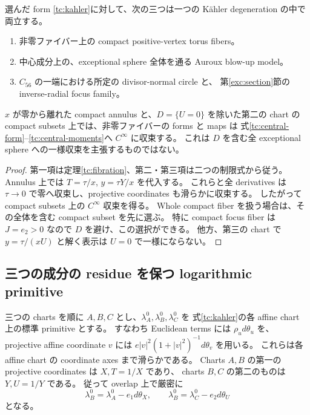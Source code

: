 \begin{corollary}\label{tc:common-model}
選んだ form \eqref{tc:kahler}に対して、次の三つは一つの Kähler degeneration の中で両立する。
\begin{enumerate}
\item 非零ファイバー上の compact positive-vertex torus fibers。
\item 中心成分上の、exceptional sphere 全体を通る Auroux blow-up model。
\item $C_{56}$ の一端における所定の divisor-normal circle と、
      第\ref{exc:section}節の inverse-radial focus family。
\end{enumerate}
$x$ が零から離れた compact annulus と、$D=\{U=0\}$ を除いた第二の chart の
compact subsets 上では、非零ファイバーの forms と maps は
式\eqref{tc:central-form}--\eqref{tc:central-moments}へ $C^\infty$ に収束する。
これは $D$ を含む全 exceptional sphere への一様収束を主張するものではない。
\end{corollary}

\begin{proof}
第一項は定理\ref{tc:fibration}、第二・第三項は二つの制限式から従う。
Annulus 上では $T=\tau/x$, $y=\tau Y/x$ を代入する。
これらと全 derivatives は $\tau\to0$ で零へ収束し、projective coordinates も滑らかに収束する。
したがって compact subsets 上の $C^\infty$ 収束を得る。
Whole compact fiber を扱う場合は、その全体を含む compact subset を先に選ぶ。
特に compact focus fiber は $J=e_2>0$ なので $D$ を避け、この選択ができる。
他方、第三の chart で $y=\tau/(xU)$ と解く表示は $U=0$ で一様にならない。
\end{proof}

\subsection{三つの成分の residue を保つ logarithmic primitive}
\label{tc:log-primitive}

三つの charts を順に $A,B,C$ とし、$\lambda_A^0,\lambda_B^0,\lambda_C^0$ を
式\eqref{tc:kahler}の各 affine chart 上の標準 primitive とする。
すなわち Euclidean terms には $\rho_u d\theta_u$ を、
projective affine coordinate $v$ には
$e|v|^2(1+|v|^2)^{-1}d\theta_v$ を用いる。
これらは各 affine chart の coordinate axes まで滑らかである。
Charts $A,B$ の第一の projective coordinates は $X,T=1/X$ であり、
charts $B,C$ の第二のものは $Y,U=1/Y$ である。
従って overlap 上で厳密に
\begin{equation}\label{tc:primitive-changes}
 \lambda_B^0=\lambda_A^0-e_1d\theta_X,
 \qquad
 \lambda_B^0=\lambda_C^0-e_2d\theta_U
\end{equation}
となる。

